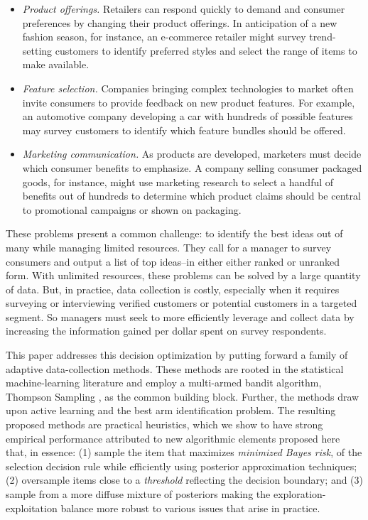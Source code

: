 \documentclass[blindrev]{informs3} %
\begin{document}
\begin{itemize}


\item \emph{Product offerings.} Retailers can respond quickly to demand and consumer preferences by changing their product offerings. In anticipation of a new fashion season, for instance, an e-commerce retailer might survey trend-setting customers to identify preferred styles and select the range of items to make available.
\item \emph{Feature selection.} Companies bringing complex technologies to market often invite consumers to provide feedback on new product features. For example, an automotive company developing a car with hundreds of possible features may survey customers to identify which feature bundles should be offered.
\item \emph{Marketing communication.} As products are developed, marketers must decide which consumer benefits to emphasize. A company selling consumer packaged goods, for instance, might use marketing research to select a handful of benefits out of hundreds to determine which product claims should be central to promotional campaigns or shown on packaging. 
\end{itemize}

These problems present a common challenge: to identify the best ideas out of many while managing limited resources. They call for a manager to survey consumers and output a list of top ideas--in either either ranked or unranked form. With unlimited resources, these problems can be solved by a large quantity of data. But, in practice, data collection is costly, especially when it requires surveying or interviewing verified customers or potential customers in a targeted segment. So managers must seek to more efficiently leverage and collect data by increasing the information gained per dollar spent on survey respondents. 

This paper addresses this decision optimization by putting forward a family of adaptive data-collection methods. These methods are rooted in the statistical machine-learning literature and employ a multi-armed bandit algorithm, Thompson Sampling \citep{thompson1933likelihood}, as the common building block. Further, the methods draw upon active learning and the best arm identification problem. The resulting proposed methods are practical heuristics, which we show to have strong empirical performance attributed to new algorithmic elements proposed here that, in essence: (1) sample the item that maximizes \emph{minimized Bayes risk}, of the selection decision rule while efficiently using posterior approximation techniques; (2) oversample items close to a \emph{threshold} reflecting the decision boundary; and (3) sample from a more diffuse mixture of posteriors making the exploration-exploitation balance more robust to various issues that arise in practice. 
\end{document}

